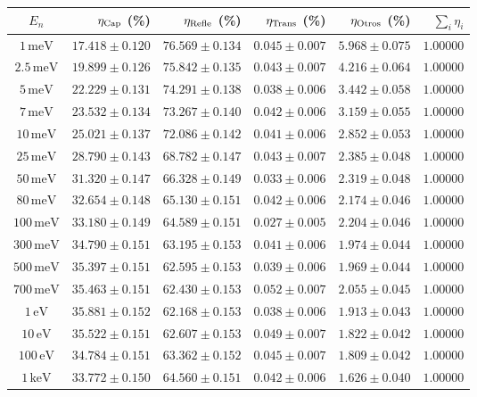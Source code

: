 \begin{tabular}{crrrrr}
\toprule
$E_n$ & $\eta_{\rm Cap}$ (\%) & $\eta_{\rm Refle}$ (\%) & $\eta_{\rm Trans}$ (\%) & $\eta_{\rm Otros}$ (\%) & $\sum_i \eta_i$ \\
\midrule
$1\,\mathrm{meV}$ & $17.418\pm0.120$ & $76.569\pm0.134$ & $0.045\pm0.007$ & $5.968\pm0.075$ & $1.00000$ \\
$2.5\,\mathrm{meV}$ & $19.899\pm0.126$ & $75.842\pm0.135$ & $0.043\pm0.007$ & $4.216\pm0.064$ & $1.00000$ \\
$5\,\mathrm{meV}$ & $22.229\pm0.131$ & $74.291\pm0.138$ & $0.038\pm0.006$ & $3.442\pm0.058$ & $1.00000$ \\
$7\,\mathrm{meV}$ & $23.532\pm0.134$ & $73.267\pm0.140$ & $0.042\pm0.006$ & $3.159\pm0.055$ & $1.00000$ \\
$10\,\mathrm{meV}$ & $25.021\pm0.137$ & $72.086\pm0.142$ & $0.041\pm0.006$ & $2.852\pm0.053$ & $1.00000$ \\
$25\,\mathrm{meV}$ & $28.790\pm0.143$ & $68.782\pm0.147$ & $0.043\pm0.007$ & $2.385\pm0.048$ & $1.00000$ \\
$50\,\mathrm{meV}$ & $31.320\pm0.147$ & $66.328\pm0.149$ & $0.033\pm0.006$ & $2.319\pm0.048$ & $1.00000$ \\
$80\,\mathrm{meV}$ & $32.654\pm0.148$ & $65.130\pm0.151$ & $0.042\pm0.006$ & $2.174\pm0.046$ & $1.00000$ \\
$100\,\mathrm{meV}$ & $33.180\pm0.149$ & $64.589\pm0.151$ & $0.027\pm0.005$ & $2.204\pm0.046$ & $1.00000$ \\
$300\,\mathrm{meV}$ & $34.790\pm0.151$ & $63.195\pm0.153$ & $0.041\pm0.006$ & $1.974\pm0.044$ & $1.00000$ \\
$500\,\mathrm{meV}$ & $35.397\pm0.151$ & $62.595\pm0.153$ & $0.039\pm0.006$ & $1.969\pm0.044$ & $1.00000$ \\
$700\,\mathrm{meV}$ & $35.463\pm0.151$ & $62.430\pm0.153$ & $0.052\pm0.007$ & $2.055\pm0.045$ & $1.00000$ \\
$1\,\mathrm{eV}$ & $35.881\pm0.152$ & $62.168\pm0.153$ & $0.038\pm0.006$ & $1.913\pm0.043$ & $1.00000$ \\
$10\,\mathrm{eV}$ & $35.522\pm0.151$ & $62.607\pm0.153$ & $0.049\pm0.007$ & $1.822\pm0.042$ & $1.00000$ \\
$100\,\mathrm{eV}$ & $34.784\pm0.151$ & $63.362\pm0.152$ & $0.045\pm0.007$ & $1.809\pm0.042$ & $1.00000$ \\
$1\,\mathrm{keV}$ & $33.772\pm0.150$ & $64.560\pm0.151$ & $0.042\pm0.006$ & $1.626\pm0.040$ & $1.00000$ \\

\end{tabular}
